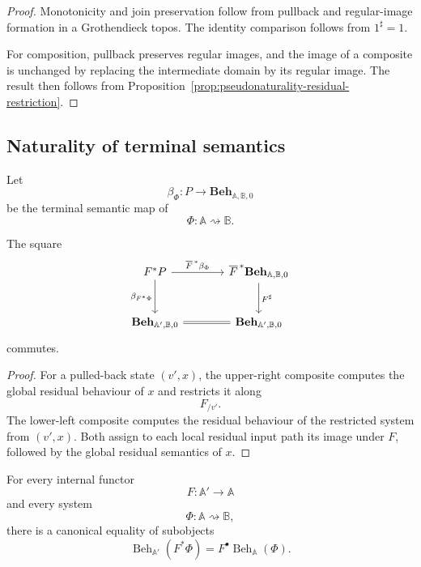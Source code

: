 \begin{proof}
Monotonicity and join preservation follow from pullback and regular-image
formation in a Grothendieck topos. The identity comparison follows from
\(1^\sharp=1\).

For composition, pullback preserves regular images, and the image of a
composite is unchanged by replacing the intermediate domain by its regular
image. The result then follows from
Proposition~\ref{prop:pseudonaturality-residual-restriction}.
\end{proof}

\subsection{Naturality of terminal semantics}
\label{subsec:naturality-terminal-semantics-input}

Let
\[
    \beta_\Phi:
    P\to
    \mathbf{Beh}_{\mathbb A,\mathbb B,0}
\]
be the terminal semantic map of
\[
    \Phi:\mathbb A\rightsquigarrow\mathbb B.
\]

\begin{proposition}
\label{prop:naturality-residual-semantics}
The square
\[
\begin{tikzcd}[column sep=large,row sep=large]
    F^\ast P
        \arrow[r, "\overline F^{\,\ast}\beta_\Phi"]
        \arrow[d, "\beta_{F^\ast\Phi}"']
    &
    \overline F^{\,\ast}
    \mathbf{Beh}_{\mathbb A,\mathbb B,0}
        \arrow[d, "F^\sharp"]
    \\
    \mathbf{Beh}_{\mathbb A',\mathbb B,0}
        \arrow[r, equal]
    &
    \mathbf{Beh}_{\mathbb A',\mathbb B,0}
\end{tikzcd}
\]
commutes.
\end{proposition}

\begin{proof}
For a pulled-back state \((v',x)\), the upper-right composite computes the
global residual behaviour of \(x\) and restricts it along
\[
    F_{/v'}.
\]
The lower-left composite computes the residual behaviour of the restricted
system from \((v',x)\). Both assign to each local residual input path its
image under \(F\), followed by the global residual semantics of \(x\).
\end{proof}

\begin{theorem}
\label{thm:behavioural-abstraction-arbitrary-restriction}
For every internal functor
\[
    F:\mathbb A'\to\mathbb A
\]
and every system
\[
    \Phi:\mathbb A\rightsquigarrow\mathbb B,
\]
there is a canonical equality of subobjects
\[
    \operatorname{Beh}_{\mathbb A'}(F^\ast\Phi)
    =
    F^\bullet
    \operatorname{Beh}_{\mathbb A}(\Phi).
\]
\end{theorem}

